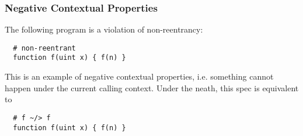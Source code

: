 \subsubsection{Negative Contextual Properties}

The following program is a violation of non-reentrancy:

\begin{lstlisting}
  # non-reentrant
  function f(uint x) { f(n) }
\end{lstlisting}

This is an example of negative contextual properties, i.e. something cannot
happen under the current calling context. Under the neath, this spec is
equivalent to

\begin{lstlisting}
  # f ~/> f
  function f(uint x) { f(n) }
\end{lstlisting}


